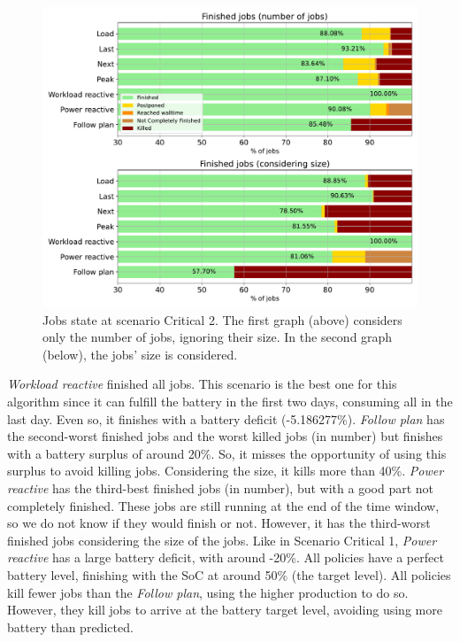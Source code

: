 \begin{figure}[!htb]
    \centering
    \includegraphics[scale=0.55]{Images/Compensations/jobs_critical_2.pdf}
    \caption[Jobs state at scenario Critical 2.]{Jobs state at scenario Critical 2. The first graph (above) considers only the number of jobs, ignoring their size. In the second graph (below), the jobs' size is considered.}
    \label{fig:jobs_critical_2}
\end{figure}

\emph{Workload reactive} finished all jobs. This scenario is the best one for this algorithm since it can fulfill the battery in the first two days, consuming all in the last day. Even so, it finishes with a battery deficit (-5.186277\%). \emph{Follow plan} has the second-worst finished jobs and the worst killed jobs (in number) but finishes with a battery surplus of around 20\%. So, it misses the opportunity of using this surplus to avoid killing jobs. Considering the size, it kills more than 40\%. \emph{Power reactive} has the third-best finished jobs (in number), but with a good part not completely finished. These jobs are still running at the end of the time window, so we do not know if they would finish or not. However, it has the third-worst finished jobs considering the size of the jobs. Like in Scenario Critical 1, \emph{Power reactive} has a large battery deficit, with around -20\%. All policies have a perfect battery level, finishing with the SoC at around 50\% (the target level). All policies kill fewer jobs than the \emph{Follow plan}, using the higher production to do so. However, they kill jobs to arrive at the battery target level, avoiding using more battery than predicted.

